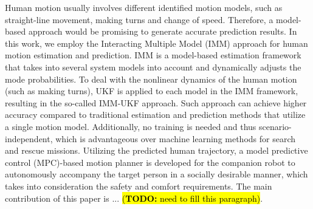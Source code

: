 \documentclass[letterpaper, 10 pt, conference]{ieeeconf}
\newcommand{\todonote}[1]{\vspace{0px} %
	\todo[inline, color=green!30]{\textbf{[Note:]} {#1}} %
}
\newcommand{\todohere}[1]{\hl{(\textbf{TODO:} #1)}}
\begin{document}
	Human motion usually involves different identified motion models, such as straight-line movement, making turns and change of speed.
	Therefore, a model-based approach would be promising to generate accurate prediction results.
	In this work, we employ the Interacting Multiple Model (IMM) approach for human motion estimation and prediction.
	IMM is a model-based estimation framework that takes into several system models into account and dynamically adjusts the mode probabilities. 
	To deal with the nonlinear dynamics of the human motion (such as making turns), UKF is applied to each model in the IMM framework, resulting in the so-called IMM-UKF approach.
	Such approach can achieve higher accuracy compared to traditional estimation and prediction methods that utilize a single motion model. 
	Additionally, no training is needed and thus scenario-independent, which is advantageous over machine learning methods for search and rescue missions.
	Utilizing the predicted human trajectory, a model predictive control (MPC)-based motion planner is developed for the companion robot to autonomously accompany the target person in a socially desirable manner, which takes into consideration the safety and comfort requirements.
	The main contribution of this paper is ... \todohere{need to fill this paragraph}.
	
\end{document}
